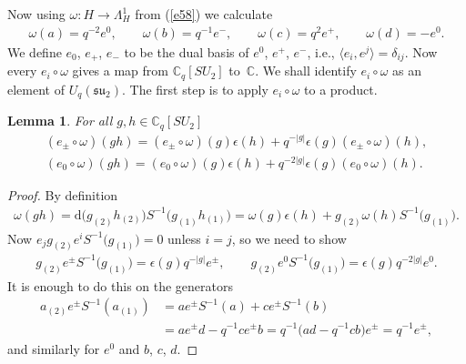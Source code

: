 \documentclass[pdftex]{sigma}
\numberwithin{equation}{section}
\newtheorem{Lemma}[Theorem]{Lemma}
\newcommand{\extd}{\mathrm{d}}
\newcommand{\C}{\mathbb{C}}
\newcommand{\<}{\langle}
\renewcommand{\>}{\rangle}
\begin{document}
Now using $ \omega\colon H\rightarrow \Lambda_{H}^{1} $ from (\ref{e58}) we calculate
\begin{gather} \label{e59}
\omega(a)= q^{-2}e^{0}, \qquad \omega(b) =q^{-1}e^{-}, \qquad \omega(c) = q^{2}e^{+}, \qquad \omega(d) = - e^{0}.
\end{gather}
We define $ e_{0}$, $e_{+}$, $e_{-} $ to be the dual basis of $ e^{0}$, $e^{+}$, $e^{-} $, i.e., $ \langle e_{i}, e^{j}\rangle= \delta_{ij} $. Now every $ e_{i}\circ \omega $ gives a map from $ \C_{q}[SU_{2}]$ to~$ \C $. We shall identify $ e_{i}\circ \omega $ as an element of $ U_{q}({\mathfrak{su}}_{2})$. The first step is to apply $ e_{i}\circ \omega $ to a product.
\begin{Lemma}\label{L1}
		For all $ g,h \in \C_{q}[SU_{2}] $
		\begin{gather*}
		(e_{\pm} \circ \omega)(g h) = (e_{\pm} \circ \omega)(g) \epsilon (h)+q^{-|g|} \epsilon (g) (e_{\pm} \circ\omega)(h),\\
		(e_{0} \circ \omega)(g h) = (e_{0} \circ \omega)(g) \epsilon (h)+q^{-2|g|} \epsilon (g) (e_{0} \circ\omega)(h).
	\end{gather*}
\end{Lemma}
\begin{proof}
	By definition
	\begin{gather*}
	\omega (g h)= \extd \big(g_{(2)} h_{(2)}\big) S^{-1} \big(g_{(1)} h_{(1)}\big)=\omega(g)\epsilon(h)+g_{(2)} \omega (h) S^{-1}\big(g_{(1)}\big).
	\end{gather*}
	Now $ e_{j} g_{(2)} e^{i} S^{-1}\big(g_{(1)}\big)=0$ unless $ i=j $, so we need to show
	\begin{gather*}
	g_{(2)} e^{\pm} S^{-1} \big(g_{(1)}\big)=\epsilon (g) q^{-|g|}e^{\pm}, \qquad g_{(2)} e^{0} S^{-1} \big(g_{(1)}\big)=\epsilon (g) q^{-2|g|}e^{0}.
	\end{gather*}
	It is enough to do this on the generators
	\begin{align*}
	a_{(2)}e^{\pm} S^{-1} (a_{(1)})&= a e^{\pm} S^{-1} (a) + c e^{\pm} S^{-1} (b)\\
	&= a e^{\pm} d-q^{-1} ce^{\pm}b=q^{-1} \big(ad-q^{-1}cb\big)e^{\pm}=q^{-1}e^{\pm},
	\end{align*}
	and similarly for $ e^{0} $ and $ b$, $c$, $d $.
\end{proof}
\end{document}

